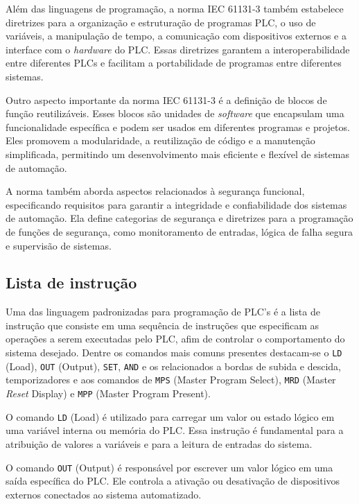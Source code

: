 Além das linguagens de programação, a norma IEC 61131-3 também estabelece diretrizes para a organização e estruturação de programas PLC, o uso de variáveis, a manipulação de tempo, a comunicação com dispositivos externos e a interface com o \textit{hardware} do PLC. Essas diretrizes garantem a interoperabilidade entre diferentes PLCs e facilitam a portabilidade de programas entre diferentes sistemas.

Outro aspecto importante da norma IEC 61131-3 é a definição de blocos de função reutilizáveis. Esses blocos são unidades de \textit{software} que encapsulam uma funcionalidade específica e podem ser usados em diferentes programas e projetos. Eles promovem a modularidade, a reutilização de código e a manutenção simplificada, permitindo um desenvolvimento mais eficiente e flexível de sistemas de automação.

A norma também aborda aspectos relacionados à segurança funcional, especificando requisitos para garantir a integridade e confiabilidade dos sistemas de automação. Ela define categorias de segurança e diretrizes para a programação de funções de segurança, como monitoramento de entradas, lógica de falha segura e supervisão de sistemas.

\subsection{Lista de instrução}

Uma das linguagem padronizadas para programação de PLC's é a lista de instrução que consiste em uma sequência de instruções que especificam as operações a serem executadas pelo PLC, afim de controlar o comportamento do sistema desejado. Dentre os comandos mais comuns presentes destacam-se o \lstinline{LD} (Load), \lstinline{OUT} (Output), \lstinline{SET}, \lstinline{AND} e os relacionados a bordas de subida e descida, temporizadores e aos comandos de \lstinline{MPS} (Master Program Select), \lstinline{MRD} (Master \textit{Reset} Display) e \lstinline{MPP} (Master Program Present).

O comando \lstinline{LD} (Load) é utilizado para carregar um valor ou estado lógico em uma variável interna ou memória do PLC. Essa instrução é fundamental para a atribuição de valores a variáveis e para a leitura de entradas do sistema.

O comando \lstinline{OUT} (Output) é responsável por escrever um valor lógico em uma saída específica do PLC. Ele controla a ativação ou desativação de dispositivos externos conectados ao sistema automatizado.

